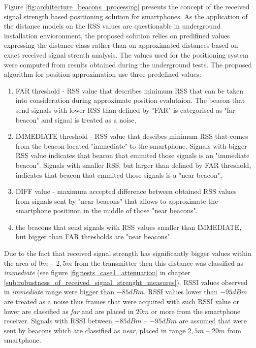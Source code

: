 \documentclass[../main.tex]{subfiles}
\begin{document}
Figure \ref{fig:architecture_beacons_processing} presents the concept of the received signal strength based positioning solution for smartphones. As the application of the distance models on the RSS values are questionable in underground installation envioronment, the proposed solution relies on predifined values expressing the distance class rather than on approximated distances based on exact received signal strenth analysis. The values used for the positioning system were computed from results obtained during the underground tests. The proposed algorithm for position approximation use three predefined values:
\begin{enumerate}
	\item FAR threshold - RSS value that describes minimum RSS that can be taken into consideration during approximate position evalutaion. The beacon that send signals with lower RSS than defined by "FAR" is categorised as "far beacon" and signal is treated as a noise,
	\item IMMEDIATE threshold - RSS value that descibes minimum RSS that comes from the beacon located "immediate" to the smartphone. Signals with bigger RSS value indicates that beacon that emmited those signals is an "immediate beacon". Signals with smaller RSS, but larger than defined by FAR threshold, indicates that beacon that emmited those signals is a "near beacon",
	\item DIFF value - maximum accepted difference between obtained RSS values from signals sent by "near beacons" that allows to approximate the smartphone positinon in the middle of those "near beacons".
	\item the beacons that send signals with RSS values smaller than IMMEDIATE, but bigger than FAR thresholds are "near beacons".
\end{enumerate}

Due to the fact that received signal strength has significantly bigger values within the area of $0 m$ -- $2,5 m$ from the transmitter then this distance was classified as \textit{immediate} (see figure \ref{fig:tests_case1_attenuation} in chapter \ref{sub:robustness_of_received_signal_strenght_measures}). RSSI values observed in \textit{immediate} range were bigger than $-85 dBm$. RSSI values lower than $-95 dBm$ are treated as a noise thus frames that were acquired with such RSSI value or lower are classified as \textit{far} and are placed in $20 m$ or more from the smartphone receiver. Signals with RSSI between $-85 dBm$ -- $-95 dBm$ are assumed that were sent by beacons which are classified as \textit{near}, placed in range $2,5 m$ -- $20 m$ from smartphone.
\end{document}
